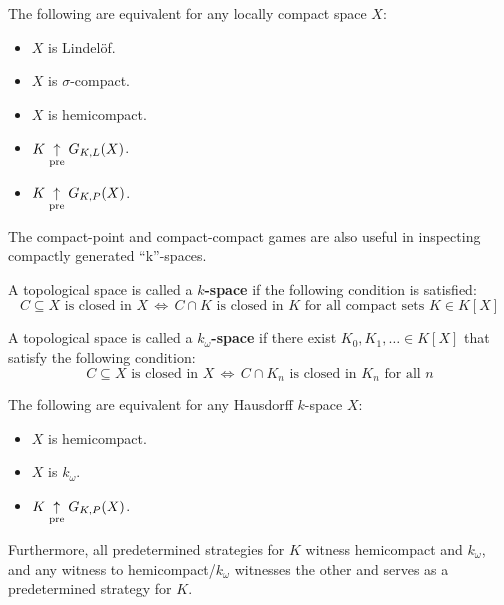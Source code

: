 \begin{corollary}
The following are equivalent for any locally compact space $X$:
  \begin{itemize}
  \item $X$ is Lindel\"of.
  \item $X$ is $\sigma$-compact.
  \item $X$ is hemicompact.
  \item $K \underset{\text{pre}}{\uparrow} G_{K,L}(X)$.
  \item $K \underset{\text{pre}}{\uparrow} G_{K,P}(X)$.
  \end{itemize}
\end{corollary}

The compact-point and compact-compact games are also useful in inspecting compactly generated ``k''-spaces.

\begin{definition}
A topological space is called a \textbf{$k$-space} if the following condition is satisfied: \[C \subseteq X \text{ is closed in } X\, \Leftrightarrow \, C\cap K \text{ is closed in } K \text{ for all compact sets } K\in K[X]\]
\end{definition}

\begin{definition}
A topological space is called a \textbf{$k_\omega$-space} if there exist $K_0,K_1,\dots \in K[X]$ that satisfy the following condition: \[C \subseteq X \text{ is closed in } X\, \Leftrightarrow \, C \cap K_n \text{ is closed in } K_n \text{ for all } n\]
\end{definition}

\begin{theorem}
The following are equivalent for any Hausdorff $k$-space $X$:
  \begin{itemize}
  \item $X$ is hemicompact.
  \item $X$ is $k_{\omega}$.
  \item $K \underset{\text{pre}}{\uparrow} G_{K,P}(X)$.
  \end{itemize}
Furthermore, all predetermined strategies for $K$ witness hemicompact and $k_\omega$, and any witness to hemicompact/$k_\omega$ witnesses the other and serves as a predetermined strategy for $K$.
\end{theorem}

